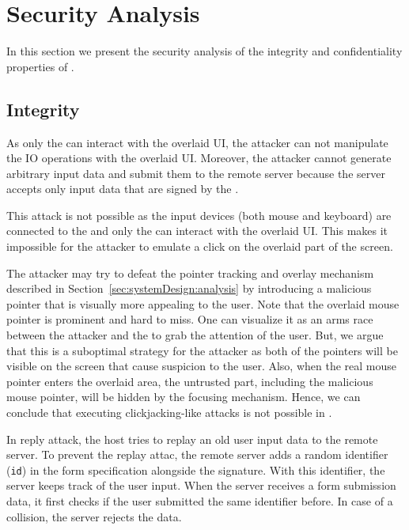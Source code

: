 \section{Security Analysis}
\label{sec:securityAnalysis}


In this section we present the security analysis of the integrity and confidentiality properties of \name. 


\subsection{Integrity}
\label{sec:securityAnalysis:integrity}



 As only the \device can interact with the overlaid UI, the attacker can not manipulate the IO operations with the overlaid UI. Moreover, the attacker cannot generate arbitrary input data and submit them to the remote server because the server accepts only input data that are signed by the \device.

 This attack is not possible as the input devices (both mouse and keyboard) are connected to the \device and only the \device can interact with the overlaid UI. This makes it impossible for the attacker to emulate a click on the overlaid part of the screen.  

The attacker may try to defeat the \name pointer tracking and overlay mechanism described in Section~\ref{sec:systemDesign:analysis} by introducing a malicious pointer that is visually more appealing to the user. Note that the \device overlaid mouse pointer is prominent and hard to miss. One can visualize it as an arms race between the attacker and the \device to grab the attention of the user. But, we argue that this is a suboptimal strategy for the attacker as both of the pointers will be visible on the screen that cause suspicion to the user. Also, when the real mouse pointer enters the overlaid area, the untrusted part, including the malicious mouse pointer, will be hidden by the focusing mechanism. Hence, we can conclude that executing clickjacking-like attacks is not possible in \name.



 In reply attack, the host tries to replay an old user input data to the remote server. To prevent the replay attac, the remote server adds a random identifier (\texttt{id}) in the form specification alongside the signature. With this identifier, the server keeps track of the user input. When the server receives a form submission data, it first checks if the user submitted the same identifier before. In case of a collision, the server rejects the data. 

